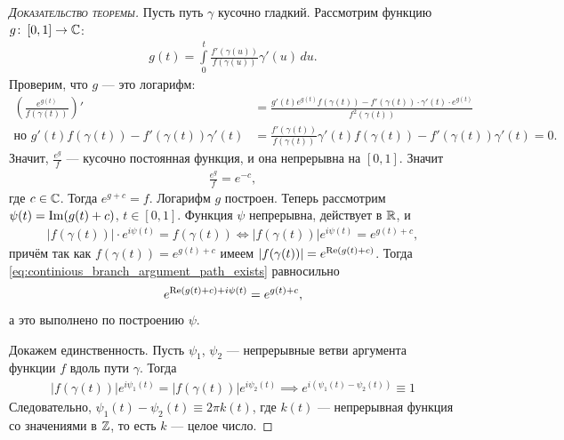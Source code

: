 \documentclass[../complex-analysis.tex]{subfiles}
\begin{document}
\begin{proof}[\normalfont\textsc{Доказательство теоремы}]
 Пусть путь $ \gamma $ кусочно гладкий. Рассмотрим функцию $ g \colon\,[0, 1] \to \mathbb{C} $:
 \begin{align*}
  g(t) = \int\limits_{0}^{t} \frac{f'(\gamma(u))}{f(\gamma(u))} \gamma'(u)\,du.
 \end{align*} Проверим, что $ g $ --- это логарифм:
 \begin{align*}
  \left(\frac{e^{g(t)}}{f(\gamma(t))}\right)' &= \frac{g'(t)e^{g(t)}f(\gamma(t)) - f'(\gamma(t)) \cdot \gamma'(t) \cdot e^{g(t)}}{f^{2}(\gamma(t))}\\
  \text{но } g'(t) f(\gamma(t)) - f'(\gamma(t))\gamma'(t) &= \frac{f'(\gamma(t))}{f(\gamma(t))} \gamma'(t) f(\gamma(t)) - f'(\gamma(t)) \gamma'(t) = 0.
 \end{align*} Значит, $ \frac{e^{g}}{f} $ --- кусочно постоянная функция, и она непрерывна на $ [0,1] $. Значит
 \begin{align*}
  \frac{e^{g}}{f} = e^{-c}, 
 \end{align*} где $ c \in \mathbb{C} $. Тогда $ e^{g+c} = f $. Логарифм $ g $ построен. Теперь рассмотрим $ \psi(t) = \operatorname{Im} (g(t) + c) $, $ t \in [0,1] $. Функция $ \psi $ непрерывна, действует в $ \mathbb{R} $, и
 \begin{align}
  \left| f(\gamma(t)) \right| \cdot e^{i\psi(t)} = f(\gamma(t)) \iff \left| f(\gamma(t)) \right|e^{i\psi(t)} = e^{g(t) + c}, \label{eq:continious_branch_argument_path_exists}
 \end{align} причём так как $ f(\gamma(t)) = e^{g(t)+c} $ имеем $ \left| f(\gamma(t)) \right|  = e^{\operatorname{Re}(g(t)+c)}$. Тогда \eqref{eq:continious_branch_argument_path_exists} равносильно
 \begin{align*}
  e^{\operatorname{Re}(g(t)+c) + i\psi(t)} = e^{g(t) + c},
 \end{align*} а это выполнено по построению $ \psi $.

 Докажем единственность. Пусть $ \psi_1 $, $ \psi_2 $ --- непрерывные ветви аргумента функции $ f $ вдоль пути $ \gamma $. Тогда
 \begin{align*}
  \left| f(\gamma(t)) \right|e^{i\psi_1(t)} = \left| f(\gamma(t)) \right|e^{i\psi_2(t)} \implies e^{i(\psi_1(t)-\psi_2(t))}  \equiv 1
 \end{align*} Следовательно, $ \psi_1(t) - \psi_2(t) \equiv 2\pi k(t)$, где $ k(t) $ --- непрерывная функция со значениями в $ \mathbb{Z} $, то есть $ k $ --- целое число.
\end{proof}
\end{document}
